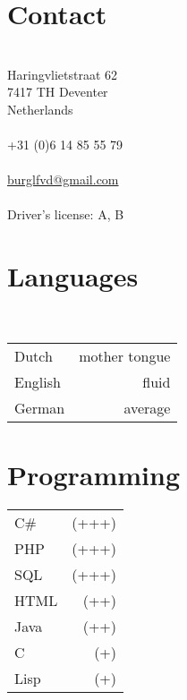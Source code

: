 \documentclass[]{friggeri-cv} %
\begin{document}


\begin{aside} %
   \section{Contact}\\
   Haringvlietstraat 62\\
   7417 TH Deventer\\
   Netherlands\\
   ~\\
   +31 (0)6 14 85 55 79\\
   ~\\
   \href{mailto:burglfvd@gmail.com}{burglfvd@gmail.com}\\
   ~\\
   Driver's license: A, B\\

   \section{Languages}\\
   \begin{tabular}{l@{\quad} r}
      Dutch & mother tongue\\
      English & fluid\\
      German & average\\
   \end{tabular}

   \section{Programming}
   \begin{tabular}{l@{\quad} r}
      C\#  & (+++)\\
      PHP & (+++)\\
      SQL & (+++)\\
      HTML & (++)\\
      Java  & (++)\\
      C & (+)\\
      Lisp & (+)\\
   \end{tabular}

\end{aside}
\end{document}
